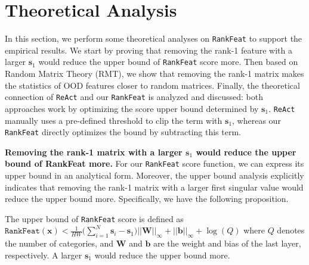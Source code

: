 \section{Theoretical Analysis}
\label{sec:theory}

In this section, we perform some theoretical analyses on \texttt{RankFeat} to support the empirical results. We start by proving that removing the rank-1 feature with a larger $\mathbf{s}_{1}$ would reduce the upper bound of \texttt{RankFeat} score more. Then based on Random Matrix Theory (RMT), we show that removing the rank-1 matrix makes the statistics of OOD features closer to random matrices. Finally, the theoretical connection of \texttt{ReAct} and our \texttt{RankFeat} is analyzed and discussed: both approaches work by optimizing the score upper bound determined by $\mathbf{s}_{1}$. \texttt{ReAct} manually uses a pre-defined threshold to clip the term with $\mathbf{s}_{1}$, whereas our \texttt{RankFeat} directly optimizes the bound by subtracting this term.



\noindent \textbf{Removing the rank-1 matrix with a larger $\mathbf{s}_{1}$ would reduce the upper bound of RankFeat more.} For our \texttt{RankFeat} score function, we can express its upper bound in an analytical form. Moreover, the upper bound analysis explicitly indicates that removing the rank-1 matrix with a larger first singular value would reduce the upper bound more. Specifically, we have the following proposition.

\begin{prop}
The upper bound of \texttt{RankFeat} score is defined as $\texttt{RankFeat}(\mathbf{x}) <\frac{1}{HW} \Big(\sum_{i=1}^{N} \mathbf{s}_{i} - \mathbf{s}_{1}\Big) ||\mathbf{W}||_{\infty} +  ||\mathbf{b}||_{\infty} + \log(Q)$ where $Q$ denotes the number of categories, and $\mathbf{W}$ and $\mathbf{b}$ are the weight and bias of the last layer, respectively. A larger $\mathbf{s}_{1}$ would reduce the upper bound more.
\end{prop}

